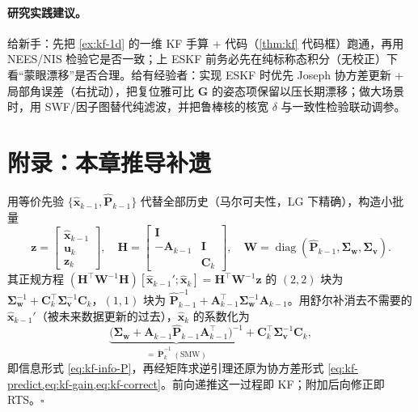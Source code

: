 \paragraph{研究实践建议。}
给新手：先把 \cref{ex:kf-1d} 的一维 KF 手算 + 代码（\cref{thm:kf} 代码框）跑通，再用 NEES/NIS 检验它是否一致；上 ESKF 前务必先在纯标称态积分（无校正）下看“蒙眼漂移”是否合理。给有经验者：实现 ESKF 时优先 Joseph 协方差更新 + 局部角误差（右扰动），把复位雅可比 $\mathbf{G}$ 的姿态项保留以压长期漂移；做大场景时，用 SWF/因子图替代纯滤波，并把鲁棒核的核宽 $\delta$ 与一致性检验联动调参。

\section*{附录：本章推导补遗}
\label{sec:eskf-appendix}

\begin{derivation}
用等价先验 $\{\hat{\mathbf{x}}_{k-1},\hat{\mathbf{P}}_{k-1}\}$ 代替全部历史（马尔可夫性，LG 下精确），构造小批量
\[
  \mathbf{z}=\begin{bmatrix}\hat{\mathbf{x}}_{k-1}\\\mathbf{u}_k\\\mathbf{z}_k\end{bmatrix},\quad
  \mathbf{H}=\begin{bmatrix}\mathbf{I}&\\-\mathbf{A}_{k-1}&\mathbf{I}\\&\mathbf{C}_k\end{bmatrix},\quad
  \mathbf{W}=\operatorname{diag}(\hat{\mathbf{P}}_{k-1},\boldsymbol{\Sigma}_{\mathbf{w}},\boldsymbol{\Sigma}_{\mathbf{v}}).
\]
其正规方程 $(\mathbf{H}^\top\mathbf{W}^{-1}\mathbf{H})[\hat{\mathbf{x}}_{k-1}';\hat{\mathbf{x}}_k]=\mathbf{H}^\top\mathbf{W}^{-1}\mathbf{z}$ 的 $(2,2)$ 块为 $\boldsymbol{\Sigma}_{\mathbf{w}}^{-1}+\mathbf{C}_k^\top\boldsymbol{\Sigma}_{\mathbf{v}}^{-1}\mathbf{C}_k$，$(1,1)$ 块为 $\hat{\mathbf{P}}_{k-1}^{-1}+\mathbf{A}_{k-1}^\top\boldsymbol{\Sigma}_{\mathbf{w}}^{-1}\mathbf{A}_{k-1}$。用舒尔补消去不需要的 $\hat{\mathbf{x}}_{k-1}'$（被未来数据更新的过去），$\hat{\mathbf{x}}_k$ 的系数化为
\[
  \underbrace{\big(\boldsymbol{\Sigma}_{\mathbf{w}}+\mathbf{A}_{k-1}\hat{\mathbf{P}}_{k-1}\mathbf{A}_{k-1}^\top\big)^{-1}}_{=\,\check{\mathbf{P}}_k^{-1}\ (\text{SMW})}+\mathbf{C}_k^\top\boldsymbol{\Sigma}_{\mathbf{v}}^{-1}\mathbf{C}_k,
\]
即信息形式 \cref{eq:kf-info-P}，再经矩阵求逆引理还原为协方差形式 \cref{eq:kf-predict,eq:kf-gain,eq:kf-correct}。前向递推这一过程即 KF；附加后向修正即 RTS。\hfill$\square$
\end{derivation}

